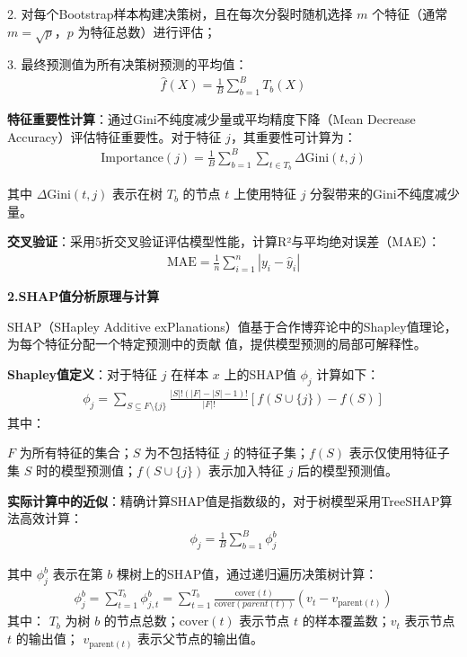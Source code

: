 \documentclass{article}
\begin{document}
2. 对每个Bootstrap样本构建决策树，且在每次分裂时随机选择 $ m $ 个特征（通常 $ m = \sqrt{p} $，$ p $ 为特征总数）进行评估；

3. 最终预测值为所有决策树预测的平均值：
\begin{gather}
    \hat{f}(X) = \frac{1}{B} \sum_{b=1}^{B} T_b(X) \tag{17}
\end{gather}

\textbf{特征重要性计算}：通过Gini不纯度减少量或平均精度下降（Mean Decrease Accuracy）评估特征重要性。对于特征 $ j $，其重要性可计算为：
\begin{gather}
    \text{Importance}(j) = \frac{1}{B} \sum_{b=1}^{B} \sum_{t \in T_b} \Delta \text{Gini}(t, j) \tag{18}
\end{gather}

其中 $ \Delta \text{Gini}(t, j) $ 表示在树 $ T_b $ 的节点 $ t $ 上使用特征 $ j $ 分裂带来的Gini不纯度减少量。

\textbf{交叉验证}：采用5折交叉验证评估模型性能，计算R²与平均绝对误差（MAE）：
\begin{gather}
    \text{MAE} = \frac{1}{n} \sum_{i=1}^n |y_i - \hat{y}_i| \tag{19}
\end{gather}

\textbf{2.SHAP值分析原理与计算}

SHAP（SHapley Additive exPlanations）值基于合作博弈论中的Shapley值理论，为每个特征分配一个特定预测中的贡献
值，提供模型预测的局部可解释性。

\textbf{Shapley值定义}：对于特征 $ j $ 在样本 $ x $ 上的SHAP值 $ \phi_j $ 计算如下：
\begin{gather}
    \phi_j = \sum_{S \subseteq F \setminus \{j\}} \frac{|S|! (|F| - |S| - 1)!}{|F|!} [f(S \cup \{j\}) - f(S)] \tag{20}
\end{gather}
其中：

$ F $ 为所有特征的集合；$ S $ 为不包括特征 $ j $ 的特征子集；$ f(S) $ 表示仅使用特征子集 $ S $ 时的模型预测值；$ f(S \cup \{j\}) $ 表示加入特征 $ j $ 后的模型预测值。

\textbf{实际计算中的近似}：精确计算SHAP值是指数级的，对于树模型采用TreeSHAP算法高效计算：
\begin{gather}
    \phi_j = \frac{1}{B} \sum_{b=1}^{B} \phi_j^b \tag{21}
\end{gather}

其中 $ \phi_j^b $ 表示在第 $ b $ 棵树上的SHAP值，通过递归遍历决策树计算：
\begin{gather}
    \phi_j^b = \sum_{t=1}^{T_b} \phi_{j,t}^b = \sum_{t=1}^{T_b} \frac{\text{cover}(t)}{\text{cover}(parent(t))} (v_t - v_{\text{parent}(t)}) \tag{22}
\end{gather}
其中：
$ T_b $ 为树 $ b $ 的节点总数；$ \text{cover}(t) $ 表示节点 $ t $ 的样本覆盖数；$ v_t $ 表示节点 $ t $ 的输出值；
$ v_{\text{parent}(t)} $ 表示父节点的输出值。
\end{document}
